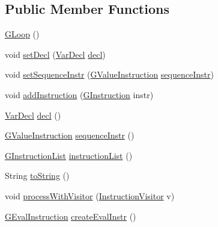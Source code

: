 \subsection*{Public Member Functions}
\begin{DoxyCompactItemize}
\item 
\hyperlink{classorg_1_1tzi_1_1use_1_1gen_1_1assl_1_1statics_1_1_g_loop_a38776d69abd46eca55f858dbb752e616}{G\-Loop} ()
\item 
void \hyperlink{classorg_1_1tzi_1_1use_1_1gen_1_1assl_1_1statics_1_1_g_loop_af83ade09242daa2738391cb11524074d}{set\-Decl} (\hyperlink{classorg_1_1tzi_1_1use_1_1uml_1_1ocl_1_1expr_1_1_var_decl}{Var\-Decl} \hyperlink{classorg_1_1tzi_1_1use_1_1gen_1_1assl_1_1statics_1_1_g_loop_aa21516efe8e9907f7bb0005f769814ce}{decl})
\item 
void \hyperlink{classorg_1_1tzi_1_1use_1_1gen_1_1assl_1_1statics_1_1_g_loop_ad08eb93eb4281f1dfca3cf8186807e18}{set\-Sequence\-Instr} (\hyperlink{interfaceorg_1_1tzi_1_1use_1_1gen_1_1assl_1_1statics_1_1_g_value_instruction}{G\-Value\-Instruction} \hyperlink{classorg_1_1tzi_1_1use_1_1gen_1_1assl_1_1statics_1_1_g_loop_ae5dd4109d726c2d60b59febbe0fad814}{sequence\-Instr})
\item 
void \hyperlink{classorg_1_1tzi_1_1use_1_1gen_1_1assl_1_1statics_1_1_g_loop_af5e2322864cfc357a1b6735c4356c4a9}{add\-Instruction} (\hyperlink{interfaceorg_1_1tzi_1_1use_1_1gen_1_1assl_1_1statics_1_1_g_instruction}{G\-Instruction} instr)
\item 
\hyperlink{classorg_1_1tzi_1_1use_1_1uml_1_1ocl_1_1expr_1_1_var_decl}{Var\-Decl} \hyperlink{classorg_1_1tzi_1_1use_1_1gen_1_1assl_1_1statics_1_1_g_loop_aa21516efe8e9907f7bb0005f769814ce}{decl} ()
\item 
\hyperlink{interfaceorg_1_1tzi_1_1use_1_1gen_1_1assl_1_1statics_1_1_g_value_instruction}{G\-Value\-Instruction} \hyperlink{classorg_1_1tzi_1_1use_1_1gen_1_1assl_1_1statics_1_1_g_loop_ae5dd4109d726c2d60b59febbe0fad814}{sequence\-Instr} ()
\item 
\hyperlink{classorg_1_1tzi_1_1use_1_1gen_1_1assl_1_1statics_1_1_g_instruction_list}{G\-Instruction\-List} \hyperlink{classorg_1_1tzi_1_1use_1_1gen_1_1assl_1_1statics_1_1_g_loop_a80163b953a1f85a45a06842d1d8daeca}{instruction\-List} ()
\item 
String \hyperlink{classorg_1_1tzi_1_1use_1_1gen_1_1assl_1_1statics_1_1_g_loop_aea24c0abc44b048a49d76446ae352a9f}{to\-String} ()
\item 
void \hyperlink{classorg_1_1tzi_1_1use_1_1gen_1_1assl_1_1statics_1_1_g_loop_ab68b54cc5a7e3dc390de37d41cb3e118}{process\-With\-Visitor} (\hyperlink{interfaceorg_1_1tzi_1_1use_1_1gen_1_1assl_1_1statics_1_1_instruction_visitor}{Instruction\-Visitor} v)
\item 
\hyperlink{classorg_1_1tzi_1_1use_1_1gen_1_1assl_1_1dynamics_1_1_g_eval_instruction}{G\-Eval\-Instruction} \hyperlink{classorg_1_1tzi_1_1use_1_1gen_1_1assl_1_1statics_1_1_g_loop_a5406925b5f829c88fe1f52cadd1da0bf}{create\-Eval\-Instr} ()
\end{DoxyCompactItemize}


